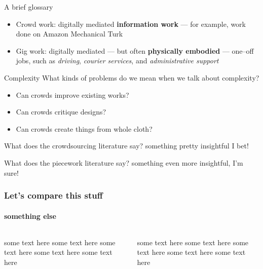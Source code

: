 \documentclass{beamer}
\begin{document}
\begin{frame}{A brief glossary}
    \begin{itemize}
      \item Crowd work: digitally mediated \textbf{information work}
      --- for example, work done on Amazon Mechanical Turk~\cite{crowdworkFuture}
      \item Gig work: digitally mediated --- but often \textbf{physically embodied} --- one--off jobs,
      such as
      \textit{driving},
      \textit{courier services},
      and \textit{administrative support}~\cite{friedman2014workers,Parigi:2016:GE:3026779.3013496}
    \end{itemize}
\end{frame}


\begin{frame}{Complexity}
  What kinds of problems do we mean when we talk about complexity?
  \begin{itemize}
    \item Can crowds improve existing works?~\cite{bernsteinSoylent,Kim:2014:CSI:2556288.2556986}
    \item Can crowds critique designs?~\cite{yuanAlmost}
    \item Can crowds create things from whole cloth?~\cite{KimStoria,Kim2017,Hahn:2016:KAB:2858036.2858364,Lasecki:2014:LSR:2661334.2661352}
  \end{itemize}
\end{frame}


\begin{frame}{What does the crowdsourcing literature say?}
    something pretty insightful I bet!
\end{frame}

\begin{frame}{What does the piecework literature say?}
    something even more insightful, I'm sure!
\end{frame}

\begin{frame}[t]\frametitle{Let's compare this stuff}
\framesubtitle{something else}
  \begin{columns}
  \begin{column}{0.5\textwidth}
     some text here some text here some text here some text here some text here

  \end{column}

  \begin{column}{0.5\textwidth}
     some text here some text here some text here some text here some text here

  \end{column}
  \end{columns}
\end{frame}
\end{document}

